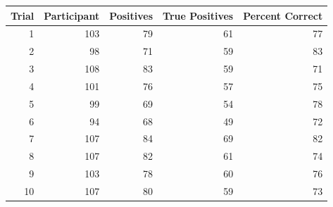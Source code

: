 \begin{tabular}{rrrrr}
\toprule
Trial & Participant & Positives & True Positives & Percent Correct \\
\midrule
1 & 103 & 79 & 61 & 77 \\
2 & 98 & 71 & 59 & 83 \\
3 & 108 & 83 & 59 & 71 \\
4 & 101 & 76 & 57 & 75 \\
5 & 99 & 69 & 54 & 78 \\
6 & 94 & 68 & 49 & 72 \\
7 & 107 & 84 & 69 & 82 \\
8 & 107 & 82 & 61 & 74 \\
9 & 103 & 78 & 60 & 76 \\
10 & 107 & 80 & 59 & 73 \\
\bottomrule
\end{tabular}
